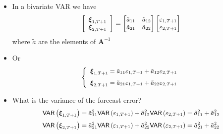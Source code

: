 \documentclass[10pt,handout]{beamer}
\begin{document}
\vspace{0.1cm}

\begin{frame}
\begin{itemize}
\item In a bivariate VAR we have%
\begin{equation*}
{\small \left[ 
\begin{array}{c}
\mathbf{\xi }_{1,T+1} \\ 
\mathbf{\xi }_{2,T+1}%
\end{array}%
\right] =%
\begin{bmatrix}
\tilde{a}_{11} & \tilde{a}_{12} \\ 
\tilde{a}_{21} & \tilde{a}_{22}%
\end{bmatrix}%
\begin{bmatrix}
\varepsilon _{1,T+1} \\ 
\varepsilon _{2,T+1}%
\end{bmatrix}%
}
\end{equation*}%
where $\tilde{a}$ are the elements of $\mathbf{A}^{-1}$

\item Or%
\begin{equation*}
{\small \left\{ 
\begin{array}{l}
\mathbf{\xi }_{1,T+1}=\tilde{a}_{11}\varepsilon _{1,T+1}+\tilde{a}%
_{12}\varepsilon _{2,T+1}\medskip \\ 
\mathbf{\xi }_{2,T+1}=\tilde{a}_{21}\varepsilon _{1,T+1}+\tilde{a}%
_{22}\varepsilon _{2,T+1}%
\end{array}%
\right. }
\end{equation*}

\item What is the variance of the forecast error?%
\begin{equation*}
{\small 
\begin{array}{c}
\mathsf{VAR}\left( \mathbf{\xi }_{1,T+1}\right) =\tilde{a}_{11}^{2}\mathsf{%
VAR}\left( \varepsilon _{1,T+1}\right) +\tilde{a}_{12}^{2}\mathsf{VAR}\left(
\varepsilon _{2,T+1}\right) =\tilde{a}_{11}^{2}+\tilde{a}_{12}^{2}\medskip
\\ 
\mathsf{VAR}\left( \mathbf{\xi }_{2,T+1}\right) =\tilde{a}_{21}^{2}\mathsf{%
VAR}\left( \varepsilon _{1,T+1}\right) +\tilde{a}_{22}^{2}\mathsf{VAR}\left(
\varepsilon _{2,T+1}\right) =\tilde{a}_{21}^{2}+\tilde{a}_{22}^{2}%
\end{array}%
}
\end{equation*}
\end{itemize}
\end{frame}
\end{document}

